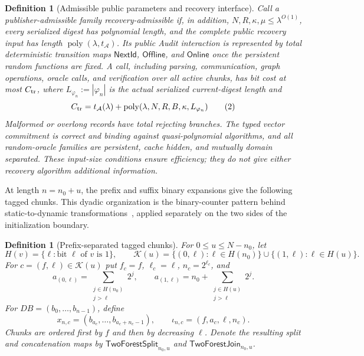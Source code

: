 \documentclass[11pt]{article}
\newtheorem{definition}[lemma]{Definition}
\begin{document}
\begin{definition}[Admissible public parameters and recovery interface]
Call a publisher-admissible family \emph{recovery-admissible} if, in addition,
$N,R,\kappa,\mu\le\lambda^{O(1)}$, every serialized digest has polynomial
length, and the complete public recovery input has length
$\operatorname{poly}(\lambda,t_{\mathcal A})$.  Its public Audit interaction
is represented by total deterministic transition maps
$\mathsf{NextId}$, $\mathsf{Offline}$, and $\mathsf{Online}$ once the persistent
random functions are fixed.  A call, including parsing, communication, graph
operations, oracle calls, and verification over all active chunks, has bit
cost at most $C_{\rm tr}$, where
$L_{\varphi_n}:=|\varphi_n|$ is the actual serialized current-digest length and
\[
 C_{\rm tr}=t_{\mathcal A}(\lambda)
   +\operatorname{poly}(\lambda,N,R,B,\kappa,L_{\varphi_n})
\tag{2}\label{eq:transition-cost}
\]
Malformed or overlong records have total rejecting branches.
The typed vector commitment is correct and binding against quasi-polynomial
algorithms, and all random-oracle families are persistent, cache hidden, and
mutually domain separated.  These input-size conditions ensure efficiency;
they do not give either recovery algorithm additional information.
\end{definition}

At length $n=n_0+u$, the prefix and suffix binary expansions give the following
tagged chunks.  This dyadic organization is the binary-counter pattern behind
static-to-dynamic transformations~\cite{BentleySaxe1980StaticDynamic}, applied
separately on the two sides of the initialization boundary.

\begin{definition}[Prefix-separated tagged chunks]
\label{def:chunks}
For $0\le u\le N-n_0$, let
\[
 H(v)=\{\ell:\text{bit }\ell\text{ of }v\text{ is }1\},\qquad
 \mathcal K(u)=\{(0,\ell):\ell\in H(n_0)\}
   \cup\{(1,\ell):\ell\in H(u)\}.
\]
For $c=(f,\ell)\in\mathcal K(u)$ put
$f_c=f$, $\ell_c=\ell$, $n_c=2^{\ell_c}$, and
\[
 a_{(0,\ell)}=\sum_{\substack{j\in H(n_0)\\j>\ell}}2^j,
 \qquad
 a_{(1,\ell)}=n_0+
   \sum_{\substack{j\in H(u)\\j>\ell}}2^j.
\]
For $\mathit{DB}=(b_0,\ldots,b_{n-1})$, define
\[
 x_{n,c}=(b_{a_c},\ldots,b_{a_c+n_c-1}),
 \qquad \iota_{n,c}=(f,a_c,\ell,n_c).
\tag{3}\label{eq:chunk-data}
\]
Chunks are ordered first by $f$ and then by decreasing $\ell$.  Denote the
resulting split and concatenation maps by $\mathsf{TwoForestSplit}_{n_0,u}$ and
$\mathsf{TwoForestJoin}_{n_0,u}$.
\end{definition}
\end{document}
